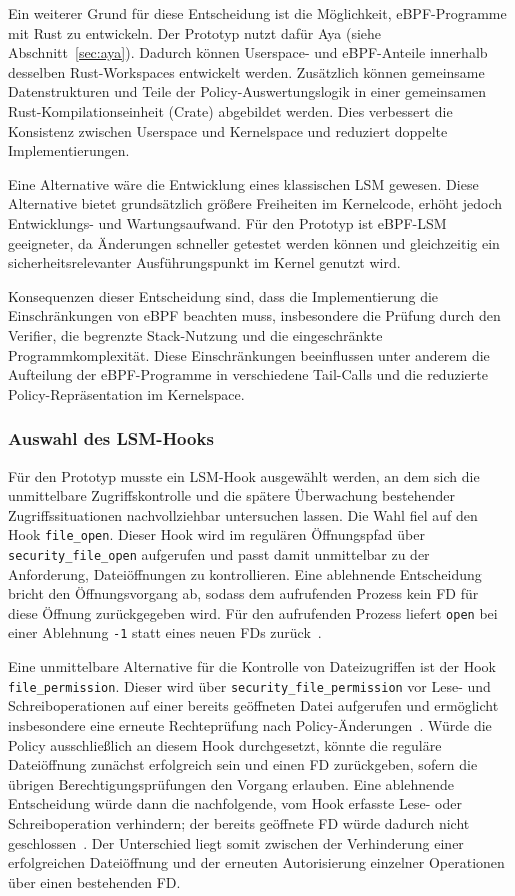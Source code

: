 Ein weiterer Grund für diese Entscheidung ist die Möglichkeit, eBPF-Programme mit Rust zu entwickeln.
Der Prototyp nutzt dafür Aya (siehe Abschnitt~\ref{sec:aya}).
Dadurch können Userspace- und eBPF-Anteile innerhalb desselben Rust-Workspaces entwickelt werden.
Zusätzlich können gemeinsame Datenstrukturen und Teile der Policy-Auswertungslogik in einer
gemeinsamen Rust-Kompilationseinheit (Crate) abgebildet werden.
Dies verbessert die Konsistenz zwischen Userspace und Kernelspace und reduziert doppelte Implementierungen.

Eine Alternative wäre die Entwicklung eines klassischen LSM gewesen.
Diese Alternative bietet grundsätzlich größere Freiheiten im Kernelcode, erhöht jedoch Entwicklungs- und Wartungsaufwand.
Für den Prototyp ist eBPF-LSM geeigneter, da Änderungen schneller getestet werden können und gleichzeitig ein sicherheitsrelevanter Ausführungspunkt im Kernel genutzt wird.

Konsequenzen dieser Entscheidung sind, dass die Implementierung die Einschränkungen von eBPF beachten muss, insbesondere die Prüfung durch den Verifier, die begrenzte Stack-Nutzung und die eingeschränkte Programmkomplexität.
Diese Einschränkungen beeinflussen unter anderem die Aufteilung der eBPF-Programme in verschiedene Tail-Calls und die reduzierte Policy-Repräsentation im Kernelspace.


\subsubsection{Auswahl des LSM-Hooks}
Für den Prototyp musste ein LSM-Hook ausgewählt werden, an dem sich die unmittelbare Zugriffskontrolle und die spätere Überwachung bestehender Zugriffssituationen nachvollziehbar untersuchen lassen.
Die Wahl fiel auf den Hook \texttt{file\_open}.
Dieser Hook wird im regulären Öffnungspfad über \texttt{security\_file\_open} aufgerufen und passt damit unmittelbar zu der Anforderung, Dateiöffnungen zu kontrollieren.
Eine ablehnende Entscheidung bricht den Öffnungsvorgang ab, sodass dem aufrufenden Prozess kein FD für diese Öffnung zurückgegeben wird.
Für den aufrufenden Prozess liefert \texttt{open} bei einer Ablehnung \texttt{-1} statt eines neuen FDs zurück~\citep{linuxFileOpenSource,linuxFileSecuritySource,manOpen}.

Eine unmittelbare Alternative für die Kontrolle von Dateizugriffen ist der Hook \texttt{file\_permission}.
Dieser wird über \texttt{security\_file\_permission} vor Lese- und Schreiboperationen auf einer bereits geöffneten Datei aufgerufen und ermöglicht insbesondere eine erneute Rechteprüfung nach Policy-Änderungen~\citep{linuxFileSecuritySource}.
Würde die Policy ausschließlich an diesem Hook durchgesetzt, könnte die reguläre Dateiöffnung zunächst erfolgreich sein und einen FD zurückgeben, sofern die übrigen Berechtigungsprüfungen den Vorgang erlauben.
Eine ablehnende Entscheidung würde dann die nachfolgende, vom Hook erfasste Lese- oder Schreiboperation verhindern; der bereits geöffnete FD würde dadurch nicht geschlossen~\citep{linuxFileOpenSource,linuxFileReadWriteSource}.
Der Unterschied liegt somit zwischen der Verhinderung einer erfolgreichen Dateiöffnung und der erneuten Autorisierung einzelner Operationen über einen bestehenden FD.

